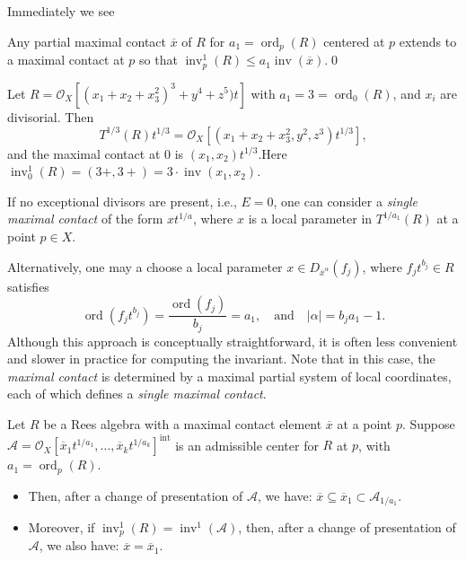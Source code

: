 \documentclass{amsart}
\newcommand{\cA}{{\mathcal A}}
\newcommand{\cO}{{\mathcal O}}
\newcommand{\ord}{{\operatorname{ord}}}
\newcommand{\inv}{{\operatorname{inv}}}
\begin{document}
Immediately we see
\begin{lemma}\label{extend} Any partial maximal contact $\overline{x}$ of $R$ for $a_1=\ord_p(R)$  centered at $p$ extends to a maximal contact at $p$ so that $\inv^1_p(R)\leq a_1\inv(\overline{x})$.\qed
\end{lemma}
\begin{example}
Let $R = \cO_X[(x_1+x_2+x_3^2)^3 + y^4 + z^5)t]$ with $a_1 = 3 = \ord_0(R)$, and $x_i$ are divisorial. Then
\[
T^{1/3}(R)t^{1/3} = \cO_X[(x_1+x_2+x_3^2, y^2, z^3)t^{1/3}],
\]
and the maximal contact at $0$ is $(x_1,x_2) t^{1/3}$.Here $\inv_0^1(R)=(3+,3+)=3\cdot\inv(x_1,x_2)$.
\end{example}
\begin{remark}
If no exceptional divisors are present, i.e., \( E = 0 \), one can consider a \emph{single maximal contact} of the form \( x t^{1/a} \), where \( x \) is a local parameter in \( T^{1/a_1}(R) \) at a point \( p \in X \).

Alternatively, one may a choose a local parameter \( x \in D_{\overline{x}^\alpha}(f_j) \), where \( f_j t^{b_j} \in R \) satisfies
\[
\ord(f_j t^{b_j}) = \frac{\ord(f_j)}{b_j} = a_1, \quad \text{and} \quad |\alpha| = b_j a_1 - 1.
\]
Although this approach is conceptually straightforward, it is often less convenient and slower in practice for computing the invariant. Note that in this case, the {\it maximal contact} is determined by a maximal partial system of local coordinates, each of which defines a {\it single maximal contact}.
\end{remark}
\begin{corollary} \label{max66}  
Let \( R \) be a Rees algebra with a maximal contact element \( \overline{x} \) at a point \( p \).  
Suppose \( \mathcal{A} = \mathcal{O}_X[\overline{x}_1 t^{1/a_1}, \ldots, \overline{x}_k t^{1/a_k}]^{\mathrm{int}} \) is an admissible center for \( R \) at \( p \), with \( a_1 = \operatorname{ord}_p(R) \).

\begin{itemize}
    \item Then, after a change of presentation of \( \mathcal{A} \), we have:
$
    \overline{x} \subseteq \overline{x}_1\subset \cA_{1/a_1}.
   $

    \item Moreover, if \( \operatorname{inv}^1_p(R) = \operatorname{inv}^1(\cA) \), then, after a change of presentation of \( \mathcal{A} \), we also have:
$
    \overline{x} = \overline{x}_1.
 $
\end{itemize}

\end{corollary}
\end{document}
